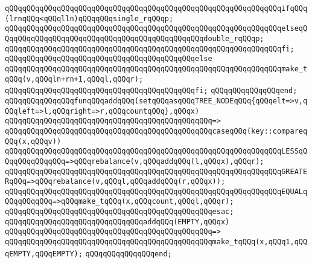 \newline
\verb|qQQqqQQqqQQqqQQqqQQqqQQqqQQqqQQqqQQqqQQqqQQqqQQqqQQqqQQqqQQqqQQqifqQQq(lrnqQQq<qQQqlln)qQQqqQQqsingle_rqQQqp;|\newline
\verb|qQQqqQQqqQQqqQQqqQQqqQQqqQQqqQQqqQQqqQQqqQQqqQQqqQQqqQQqqQQqqQQqelseqQQqqQQqqQQqqQQqqQQqqQQqqQQqqQQqqQQqqQQqqQQqqQQqdouble_rqQQqp;|\newline
\verb|qQQqqQQqqQQqqQQqqQQqqQQqqQQqqQQqqQQqqQQqqQQqqQQqqQQqqQQqqQQqqQQqfi;|\newline
\newline
\verb|qQQqqQQqqQQqqQQqqQQqqQQqqQQqqQQqqQQqqQQqqQQqelse|\newline
\verb|qQQqqQQqqQQqqQQqqQQqqQQqqQQqqQQqqQQqqQQqqQQqqQQqqQQqqQQqqQQqqQQqmake_tqQQq(v,qQQqln+rn+1,qQQql,qQQqr);|\newline
\verb|qQQqqQQqqQQqqQQqqQQqqQQqqQQqqQQqqQQqqQQqqQQqfi;|\newline
\verb|qQQqqQQqqQQqqQQqend;|\newline
\newline
\newline
\verb|qQQqqQQqqQQqqQQqfunqQQqaddqQQq(setqQQqasqQQqTREE_NODEqQQq{qQQqelt=>v,qQQqleft=>l,qQQqright=>r,qQQqcountqQQq},qQQqx)|\newline
\verb|qQQqqQQqqQQqqQQqqQQqqQQqqQQqqQQqqQQqqQQqqQQqqQQq=>|\newline
\verb|qQQqqQQqqQQqqQQqqQQqqQQqqQQqqQQqqQQqqQQqqQQqqQQqcaseqQQq(key::compareqQQq(x,qQQqv))|\newline
\verb|qQQqqQQqqQQqqQQqqQQqqQQqqQQqqQQqqQQqqQQqqQQqqQQqqQQqqQQqqQQqqQQqLESSqQQqqQQqqQQqqQQq=>qQQqrebalance(v,qQQqaddqQQq(l,qQQqx),qQQqr);|\newline
\verb|qQQqqQQqqQQqqQQqqQQqqQQqqQQqqQQqqQQqqQQqqQQqqQQqqQQqqQQqqQQqqQQqGREATERqQQq=>qQQqrebalance(v,qQQql,qQQqaddqQQq(r,qQQqx));|\newline
\verb|qQQqqQQqqQQqqQQqqQQqqQQqqQQqqQQqqQQqqQQqqQQqqQQqqQQqqQQqqQQqqQQqEQUALqQQqqQQqqQQq=>qQQqmake_tqQQq(x,qQQqcount,qQQql,qQQqr);|\newline
\verb|qQQqqQQqqQQqqQQqqQQqqQQqqQQqqQQqqQQqqQQqqQQqqQQqesac;|\newline
\newline
\verb|qQQqqQQqqQQqqQQqqQQqqQQqqQQqqQQqaddqQQq(EMPTY,qQQqx)|\newline
\verb|qQQqqQQqqQQqqQQqqQQqqQQqqQQqqQQqqQQqqQQqqQQqqQQq=>|\newline
\verb|qQQqqQQqqQQqqQQqqQQqqQQqqQQqqQQqqQQqqQQqqQQqqQQqmake_tqQQq(x,qQQq1,qQQqEMPTY,qQQqEMPTY);|\newline
\verb|qQQqqQQqqQQqqQQqend;|\newline
